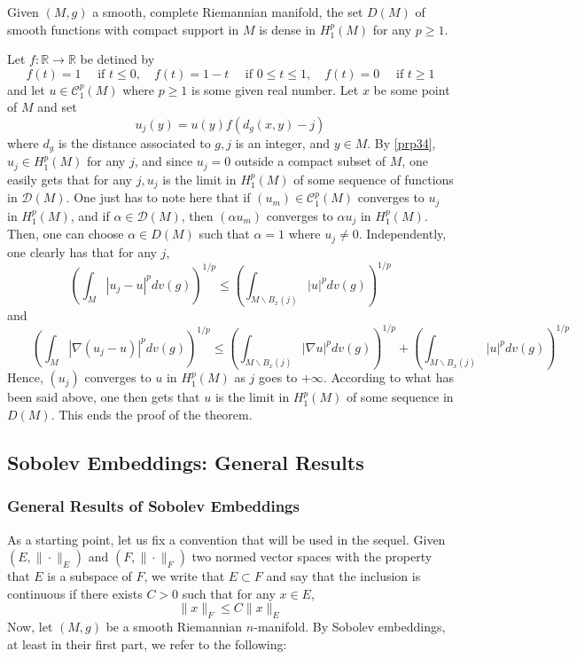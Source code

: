 \documentclass[12pt,hyperref,a4paper,UTF8]{ctexart}
\begin{document}
\begin{Theorem}
    Given $(M, g)$ a smooth, complete Riemannian manifold, the set $D(M)$ of smooth functions with compact support in $M$ is dense in $H_1^p(M)$ for any $p \geq 1$.
\label{thm34}
\end{Theorem}

\begin{Proof}
Let $f: \mathbb{R} \rightarrow \mathbb{R}$ be detined by
$$
f(t)=1 \quad \text { if } t \leq 0, \quad f(t)=1-t \quad \text { if } 0 \leq t \leq 1, \quad f(t)=0 \quad \text { if } t \geq 1
$$
and let $u \in \mathcal{C}_1^p(M)$ where $p \geq 1$ is some given real number. Let $x$ be some point of $M$ and set
$$
u_j(y)=u(y) f\left(d_g(x, y)-j\right)
$$
where $d_g$ is the distance associated to $g, j$ is an integer, and $y \in M$. By \autoref{prp34}, $u_j \in H_1^p(M)$ for any $j$, and since $u_j=0$ outside a compact subset of $M$, one easily gets that for any $j, u_j$ is the limit in $H_1^p(M)$ of some sequence of functions in $\mathcal{D}(M)$. One just has to note here that if $\left(u_m\right) \in \mathcal{C}_1^p(M)$ converges to $u_j$ in $H_1^p(M)$, and if $\alpha \in \mathcal{D}(M)$, then $\left(\alpha u_m\right)$ converges to $\alpha u_j$ in $H_1^p(M)$. Then, one can choose $\alpha \in D(M)$ such that $\alpha=1$ where $u_j \neq 0$. Independently, one clearly has that for any $j$,
$$
\left(\int_M\left|u_j-u\right|^p d v(g)\right)^{1 / p} \leq\left(\int_{M \backslash B_x(j)}|u|^p d v(g)\right)^{1 / p}
$$
and
$$
\qquad\left(\int_M\left|\nabla\left(u_j-u\right)\right|^p d v(g)\right)^{1 / p}\leq\left(\int_{M \backslash B_x(j)}|\nabla u|^p d v(g)\right)^{1 / p}+\left(\int_{M \backslash B_x(j)}|u|^p d v(g)\right)^{1 / p}
$$
Hence, $\left(u_j\right)$ converges to $u$ in $H_1^p(M)$ as $j$ goes to $+\infty$. According to what has been said above, one then gets that $u$ is the limit in $H_1^p(M)$ of some sequence in $D(M)$. This ends the proof of the theorem.
\end{Proof}

\subsection{Sobolev Embeddings: General Results}

\subsubsection{General Results of Sobolev Embeddings}
As a starting point, let us fix a convention that will be used in the sequel. Given $\left(E,\|\cdot\|_E\right)$ and $\left(F,\|\cdot\|_F\right)$ two normed vector spaces with the property that $E$ is a subspace of $F$, we write that $E \subset F$ and say that the inclusion is continuous if there exists $C>0$ such that for any $x \in E$,
$$
\|x\|_F \leq C\|x\|_E
$$
Now, let $(M, g)$ be a smooth Riemannian $n$-manifold. By Sobolev embeddings, at least in their first part, we refer to the following: 
\end{document}
